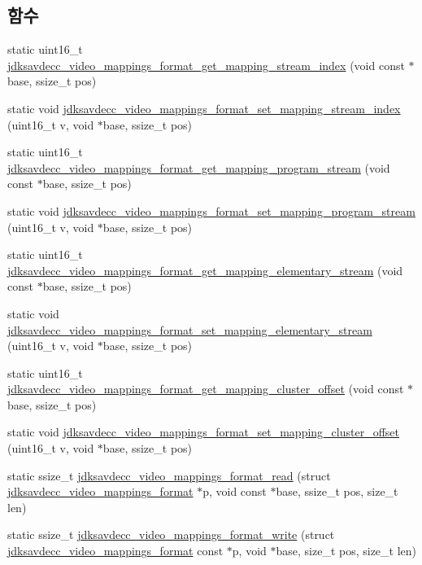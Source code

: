 \subsection*{함수}
\begin{DoxyCompactItemize}
\item 
static uint16\+\_\+t \hyperlink{group__video__mappings__format_ga9a44187a52b442634b3895522650ad52}{jdksavdecc\+\_\+video\+\_\+mappings\+\_\+format\+\_\+get\+\_\+mapping\+\_\+stream\+\_\+index} (void const $\ast$base, ssize\+\_\+t pos)
\item 
static void \hyperlink{group__video__mappings__format_gad6beea5847683de110d27fe15650e9db}{jdksavdecc\+\_\+video\+\_\+mappings\+\_\+format\+\_\+set\+\_\+mapping\+\_\+stream\+\_\+index} (uint16\+\_\+t v, void $\ast$base, ssize\+\_\+t pos)
\item 
static uint16\+\_\+t \hyperlink{group__video__mappings__format_ga836a0fc1bc8548c9818ff9761a9fb4a7}{jdksavdecc\+\_\+video\+\_\+mappings\+\_\+format\+\_\+get\+\_\+mapping\+\_\+program\+\_\+stream} (void const $\ast$base, ssize\+\_\+t pos)
\item 
static void \hyperlink{group__video__mappings__format_ga281fcb187709a7fa377ff66a49b95e76}{jdksavdecc\+\_\+video\+\_\+mappings\+\_\+format\+\_\+set\+\_\+mapping\+\_\+program\+\_\+stream} (uint16\+\_\+t v, void $\ast$base, ssize\+\_\+t pos)
\item 
static uint16\+\_\+t \hyperlink{group__video__mappings__format_ga95475c1d3ac88b5cb3e08c48b0f52f6b}{jdksavdecc\+\_\+video\+\_\+mappings\+\_\+format\+\_\+get\+\_\+mapping\+\_\+elementary\+\_\+stream} (void const $\ast$base, ssize\+\_\+t pos)
\item 
static void \hyperlink{group__video__mappings__format_ga6f4ad00b46e6cb49cc53777de9fe5af6}{jdksavdecc\+\_\+video\+\_\+mappings\+\_\+format\+\_\+set\+\_\+mapping\+\_\+elementary\+\_\+stream} (uint16\+\_\+t v, void $\ast$base, ssize\+\_\+t pos)
\item 
static uint16\+\_\+t \hyperlink{group__video__mappings__format_ga8966b74539a03c52127060ffbb15febf}{jdksavdecc\+\_\+video\+\_\+mappings\+\_\+format\+\_\+get\+\_\+mapping\+\_\+cluster\+\_\+offset} (void const $\ast$base, ssize\+\_\+t pos)
\item 
static void \hyperlink{group__video__mappings__format_gabc742cbe6f3c03eca073a8e47b0aabab}{jdksavdecc\+\_\+video\+\_\+mappings\+\_\+format\+\_\+set\+\_\+mapping\+\_\+cluster\+\_\+offset} (uint16\+\_\+t v, void $\ast$base, ssize\+\_\+t pos)
\item 
static ssize\+\_\+t \hyperlink{group__video__mappings__format_ga5e21f35c52e47c231b70218eec68a748}{jdksavdecc\+\_\+video\+\_\+mappings\+\_\+format\+\_\+read} (struct \hyperlink{structjdksavdecc__video__mappings__format}{jdksavdecc\+\_\+video\+\_\+mappings\+\_\+format} $\ast$p, void const $\ast$base, ssize\+\_\+t pos, size\+\_\+t len)
\item 
static ssize\+\_\+t \hyperlink{group__video__mappings__format_gae3218fb11dbe5d46cc96cbb284666a37}{jdksavdecc\+\_\+video\+\_\+mappings\+\_\+format\+\_\+write} (struct \hyperlink{structjdksavdecc__video__mappings__format}{jdksavdecc\+\_\+video\+\_\+mappings\+\_\+format} const $\ast$p, void $\ast$base, size\+\_\+t pos, size\+\_\+t len)
\end{DoxyCompactItemize}



